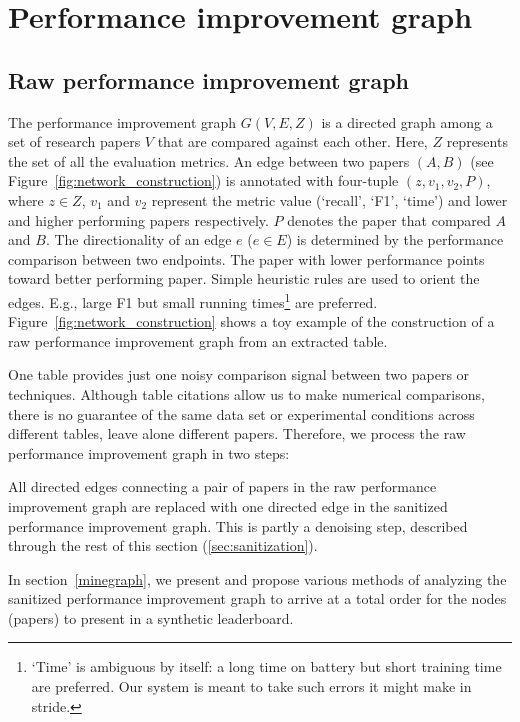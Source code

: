 \documentclass[runningheads]{llncs}
\begin{document}
\section{Performance improvement graph}
\label{pig}

\subsection{Raw performance improvement graph}

The performance improvement graph $G(V,E,Z)$ is a directed graph among a set of research papers $V$ that are compared against each other. Here,  $Z$ represents the set of all the evaluation metrics.  An edge between two papers $(A,B)$ (see Figure~\ref{fig:network_construction}) is annotated with four-tuple $(z, v_1, v_2, P)$, where $z\in Z$, $v_1$ and $v_2$ represent the metric value (`recall', `F1', `time') and lower and higher performing papers respectively.  $P$ denotes the paper that compared $A$ and $B$.  The directionality of an edge $e$ ($e\in E$) is determined by the performance comparison between two endpoints.  The paper with lower performance points toward better performing paper.  Simple heuristic rules are used to orient the edges. E.g., large F1 but small running times\footnote{`Time' is ambiguous by itself: a long time on battery but short training time are preferred. Our system is meant to take such errors it might make in stride.} are preferred. Figure~\ref{fig:network_construction} shows a toy example of the construction of a raw performance improvement graph from an extracted table. 

One table provides just one noisy comparison signal between two papers or techniques.  Although table citations allow us to make numerical comparisons, there is no guarantee of the same data set or experimental conditions across different tables, leave alone different papers.
Therefore, we process the raw performance improvement graph in two steps:
\begin{description}[leftmargin=1em]
\item[Local sanitization:]
All directed edges connecting a pair of papers in the raw performance improvement graph are replaced with one directed edge in the sanitized performance improvement graph.  This is partly a denoising step, described through the rest of this section (\ref{sec:sanitization}).
\item[Global aggregation:]
In section~\ref{minegraph}, we present and propose various methods of analyzing the sanitized performance improvement graph to arrive at a total order for the nodes (papers) to present in a synthetic leaderboard.
\end{description}
\end{document}
